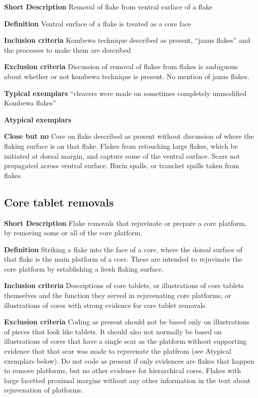 \documentclass[
]{article}
\begin{document}
\textbf{Short Description} Removal of flake from ventral surface of a
flake

\textbf{Definition} Ventral surface of a flake is treated as a core face

\textbf{Inclusion criteria} Kombewa technique described as present,
``janus flakes'' and the processes to make them are described

\textbf{Exclusion criteria} Discussion of removal of flakes from flakes
is ambiguous about whether or not kombewa technique is present. No
mention of janus flakes.

\textbf{Typical exemplars} ``cleavers were made on sometimes completely
unmodified Kombewa flakes''

\textbf{Atypical exemplars}

\textbf{Close but no} Core on flake described as present without
discussion of where the flaking surface is on that flake. Flakes from
retouching large flakes, which be initiated at dorsal margin, and
capture some of the ventral surface. Scars not propagated across ventral
surface. Burin spalls, or tranchet spalls taken from flakes.

\hypertarget{core-tablet-removals}{%
\subsection{Core tablet removals}\label{core-tablet-removals}}

\textbf{Short Description} Flake removals that rejuvinate or prepare a
core platform, by removing some or all of the core platform.

\textbf{Definition} Striking a flake into the face of a core, where the
dorsal surface of that flake is the main platform of a core. These are
intended to rejuvinate the core platform by establishing a fresh flaking
surface.

\textbf{Inclusion criteria} Descriptions of core tablets, or
illustrations of core tablets themselves and the function they served in
rejuvenating core platforms, or illustrations of cores with strong
evidence for core tablet removals.

\textbf{Exclusion criteria} Coding as present should not be based only
on illustrations of pieces that look like tablets. It should also not
normally be based on illustrations of cores that have a single scar as
the platform without supporting evidence that that scar was made to
rejuvenate the platfrom (see Atypical exemplars below). Do not code as
present if only evidences are flakes that happen to remove platforms,
but no other evidence for hierarchical cores, Flakes with large facetted
proximal margins without any other information in the text about
rejuvenation of platforms.
\end{document}
